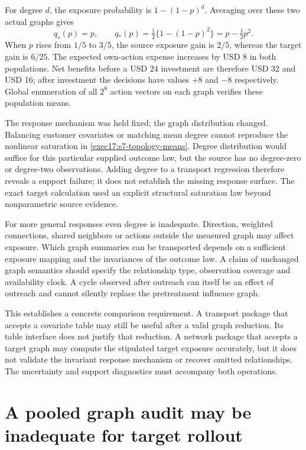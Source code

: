 For degree $d$, the exposure probability is $1-(1-p)^d$. Averaging over these
two actual graphs gives
\begin{equation}
 q_s(p)=p,\qquad q_*(p)=\tfrac12\{1-(1-p)^2\}
                    =p-\tfrac12p^2.
 \label{exec17:s7-topology-means}
\end{equation}
When $p$ rises from $1/5$ to $3/5$, the source exposure gain is $2/5$,
whereas the target gain is $6/25$. The expected own-action expense increases
by USD 8 in both populations. Net benefits before a USD 24 investment are
therefore USD 32 and USD 16; after investment the decisions have values
$+8$ and $-8$ respectively. Global enumeration of all $2^8$ action vectors
on each graph verifies these population means.~\citep{exec17_s7_math}

The response mechanism was held fixed; the graph distribution changed.
Balancing customer covariates or matching mean degree cannot reproduce the
nonlinear saturation in \eqref{exec17:s7-topology-means}. Degree distribution
would suffice for this particular supplied outcome law, but the source has
no degree-zero or degree-two observations. Adding degree to a transport
regression therefore reveals a support failure; it does not establish the
missing response surface. The exact target calculation used an explicit
structural saturation law beyond nonparametric source evidence.

For more general responses even degree is inadequate. Direction, weighted
connections, shared neighbors or actions outside the measured graph may affect
exposure. Which graph summaries can be transported depends on a sufficient
exposure mapping and the invariances of the outcome law. A claim of unchanged
graph semantics should specify the relationship type, observation coverage and
availability clock. A cycle observed after outreach can itself be an effect of
outreach and cannot silently replace the pretreatment influence graph.

This establishes a concrete comparison requirement. A transport package that
accepts a covariate table may still be useful after a valid graph reduction.
Its table interface does not justify that reduction. A network package that
accepts a target graph may compute the stipulated target exposure accurately,
but it does not validate the invariant response mechanism or recover omitted
relationships. The uncertainty and support diagnostics must accompany both
operations.

\section{A pooled graph audit may be inadequate for target rollout}
\label{exec17:s7-pooled}


